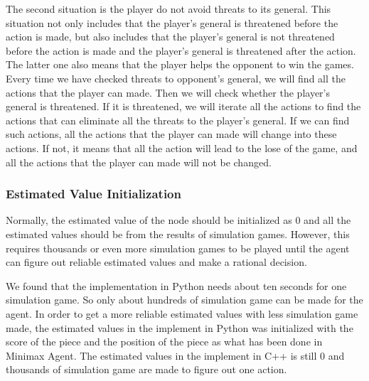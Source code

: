 The second situation is the player do not avoid threats to its general. 
This situation not only includes that the player's general is threatened before the action is made, but also includes that the player's general is not threatened before the action is made and the player's general is threatened after the action. 
The latter one also means that the player helps the opponent to win the games. 
Every time we have checked threats to opponent's general, we will find all the actions that the player can made. 
Then we will check whether the player's general is threatened. 
If it is threatened, we will iterate all the actions to find the actions that can eliminate all the threats to the player's general. 
If we can find such actions, all the actions that the player can made will change into these actions. 
If not, it means that all the action will lead to the lose of the game, and all the actions that the player can made will not be changed. 

\subsubsection{Estimated Value Initialization}
Normally, the estimated value of the node should be initialized as 0 and all the estimated values should be from the results of simulation games. 
However, this requires thousands or even more simulation games to be played until the agent can figure out reliable estimated values and make a rational decision. 

We found that the implementation in Python needs about ten seconds for one simulation game. 
So only about hundreds of simulation game can be made for the agent. 
In order to get a more reliable estimated values with less simulation game made, the estimated values in the implement in Python was initialized with the score of the piece and the position of the piece as what has been done in Minimax Agent. 
The estimated values in the implement in C++ is still 0 and thousands of simulation game are made to figure out one action. 
